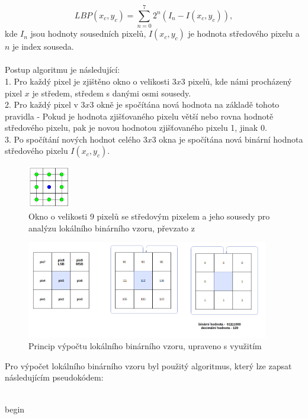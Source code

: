 $$LBP(x_c,y_c) = \sum_{n=0}^{7}2^n(I_n-I(x_c,y_c)),$$
kde $I_n$ jsou hodnoty sousedních pixelů, $I(x_c,y_c)$ je hodnota středového pixelu a $n$ je index souseda.\\\\
Postup algoritmu je následující:\\
1. Pro každý pixel je zjištěno okno o velikosti $3x3$ pixelů, kde námi procházený pixel $x$ je středem, středem s danými osmi sousedy.\\
2. Pro každý pixel v $3x3$ okně je spočítána nová hodnota na základě tohoto pravidla - Pokud je hodnota zjišťovaného pixelu větší nebo rovna hodnotě středového pixelu, pak je novou hodnotou zjišťovaného pixelu 1, jinak 0.\\
3. Po spočítání nových hodnot celého $3x3$ okna je spočítána nová binární hodnota středového pixelu $I(x_c,y_c)$.\\

\begin{figure}[!htbp]
    \centering
    \includegraphics[width=70px]{obrazky-figures/lbpn.png}
    \caption{Okno o velikosti 9 pixelů se středovým pixelem a jeho sousedy pro analýzu lokálního binárního vzoru, převzato z \cite{GragnanielloStudy}}
\end{figure}

\begin{figure}[!htbp]
    \centering
    \includegraphics[width=400px]{obrazky-figures/lbpprincip.png}
    \caption{Princip výpočtu lokálního binárního vzoru, upraveno s využitím \cite{GaikwadStudy}}
\end{figure}

Pro výpočet lokálního binárního vzoru byl použitý algoritmus, který lze zapsat následujícím pseudokódem:\\\\
\begin{algorithm}[H]
 begin\;
\end{algorithm}


